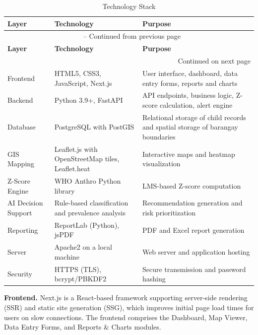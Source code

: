 \documentclass[12pt, a4paper]{report}
\begin{document}
\vspace{0.3cm}
\begin{longtable}{p{3cm} p{5.5cm} p{5.5cm}}
    \caption{Technology Stack} \label{tab:tech_stack} \\
    \toprule
    \textbf{Layer} & \textbf{Technology} & \textbf{Purpose} \\
    \midrule
    \endfirsthead
    \multicolumn{3}{c}{{\tablename\ \thetable{} -- Continued from previous page}} \\
    \toprule
    \textbf{Layer} & \textbf{Technology} & \textbf{Purpose} \\
    \midrule
    \endhead
    \midrule
    \multicolumn{3}{r}{{Continued on next page}} \\
    \endfoot
    \bottomrule
    \endlastfoot
    Frontend & HTML5, CSS3, JavaScript, Next.js & User interface, dashboard, data entry forms, reports and charts \\
    \addlinespace
    Backend & Python 3.9+, FastAPI & API endpoints, business logic, Z-score calculation, alert engine \\
    \addlinespace
    Database & PostgreSQL with PostGIS & Relational storage of child records and spatial storage of barangay boundaries \\
    \addlinespace
    GIS Mapping & Leaflet.js with OpenStreetMap tiles, Leaflet.heat & Interactive maps and heatmap visualization \\
    \addlinespace
    Z-Score Engine & WHO Anthro Python library & LMS-based Z-score computation \\
    \addlinespace
    AI Decision Support & Rule-based classification and prevalence analysis & Recommendation generation and risk prioritization \\
    \addlinespace
    Reporting & ReportLab (Python), jsPDF & PDF and Excel report generation \\
    \addlinespace
    Server & Apache2 on a local machine & Web server and application hosting \\
    \addlinespace
    Security & HTTPS (TLS), bcrypt/PBKDF2 & Secure transmission and password hashing \\
\end{longtable}
\vspace{0.3cm}

\noindent \textbf{Frontend.} Next.js is a React-based framework supporting server-side rendering (SSR) and static site generation (SSG), which improves initial page load times for users on slow connections. The frontend comprises the Dashboard, Map Viewer, Data Entry Forms, and Reports \& Charts modules.
\end{document}
